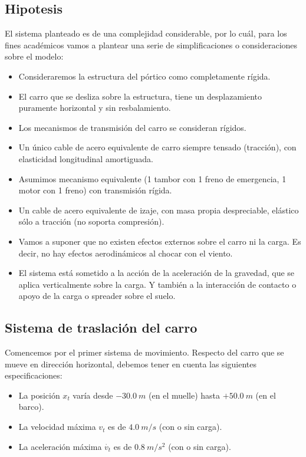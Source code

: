 \documentclass[11pt]{article}
\begin{document}
\subsection{Hipotesis}
El sistema planteado es de una complejidad considerable, por lo cuál, para los fines académicos vamos a plantear una serie de simplificaciones o consideraciones sobre el modelo:
\begin{itemize}
	\item Consideraremos la estructura del pórtico como completamente rígida.
	\item El carro que se desliza sobre la estructura, tiene un desplazamiento puramente horizontal y sin resbalamiento.
	\item Los mecanismos de transmisión del carro se consideran rígidos.
	\item Un único cable de acero equivalente de carro siempre tensado (tracción), con elasticidad longitudinal amortiguada.
	\item Asumimos mecanismo equivalente (1 tambor con 1 freno de emergencia, 1 motor con 1 freno) con transmisión rígida.
	\item Un cable de acero equivalente de izaje, con masa propia despreciable, elástico sólo a tracción (no soporta compresión).
	\item Vamos a suponer que no existen efectos externos sobre el carro ni la carga. Es decir, no hay efectos aerodinámicos al chocar con el viento.
	\item El sistema está sometido a la acción de la aceleración de la gravedad, que se aplica verticalmente sobre la carga. Y también a la interacción de contacto o apoyo de la carga o spreader sobre el suelo.
\end{itemize}

\subsection{Sistema de traslación del carro}
\label{section:carro}

Comencemos por el primer sistema de movimiento. Respecto del carro que se mueve en dirección horizontal, debemos tener en cuenta las siguientes especificaciones:
\begin{itemize}
	\item La posición $x_{t}$ varía desde $-30.0\ m$ (en el muelle) hasta $+50.0\ m$ (en el barco).
	\item La velocidad máxima $v_{t}$ es de $4.0\ m/s$ (con o sin carga).
	\item La aceleración máxima $\dot{v_{t}}$ es de $0.8\ m/s^{2}$ (con o sin carga).
\end{itemize}
\end{document}
